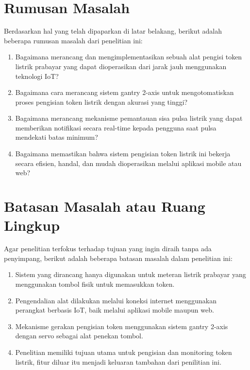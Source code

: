 \section{Rumusan Masalah}

Berdasarkan hal yang telah dipaparkan di latar belakang, berikut adalah beberapa rumusan masalah dari penelitian ini:

\begin{enumerate}
    \item Bagaimana merancang dan mengimplementasikan sebuah alat pengisi token listrik prabayar yang dapat dioperasikan dari jarak jauh menggunakan teknologi IoT?
    \item Bagaimana cara merancang sistem gantry 2-axis untuk mengotomatiskan proses pengisian token listrik dengan akurasi yang tinggi?
    \item Bagaimana merancang mekanisme pemantauan sisa pulsa listrik yang dapat memberikan notifikasi secara real-time kepada pengguna saat pulsa mendekati batas minimum?
    \item Bagaimana memastikan bahwa sistem pengisian token listrik ini bekerja secara efisien, handal, dan mudah dioperasikan melalui aplikasi mobile atau web?
\end{enumerate}

\section{Batasan Masalah atau Ruang Lingkup}
Agar penelitian terfokus terhadap tujuan yang ingin diraih tanpa ada penyimpang, berikut adalah beberapa batasan masalah dalam penelitian ini:

\begin{enumerate}
    \item Sistem yang dirancang hanya digunakan untuk meteran listrik prabayar yang menggunakan tombol fisik untuk memasukkan token.
    \item Pengendalian alat dilakukan melalui koneksi internet menggunakan perangkat berbasis IoT, baik melalui aplikasi mobile maupun web.
    \item Mekanisme gerakan pengisian token menggunakan sistem gantry 2-axis dengan servo sebagai alat penekan tombol.
    \item Penelitian memiliki tujuan utama untuk pengisian dan monitoring token listrik, fitur diluar itu menjadi keluaran tambahan dari penilitian ini.
\end{enumerate}

